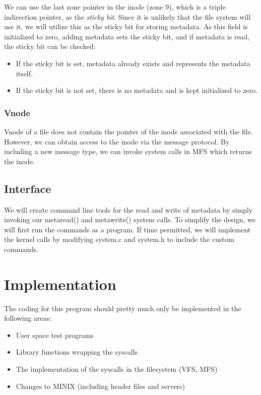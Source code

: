\documentclass[paper=a4, fontsize=11pt]{scrartcl}
\numberwithin{equation}{section} %
\numberwithin{figure}{section} %
\numberwithin{table}{section} %
\begin{document}
	We can use the last zone pointer in the inode (zone 9), which is a triple indirection pointer, as the {\it sticky bit}. Since it is unlikely that the file system will use it, we will utilize this as the sticky bit for storing metadata. As this field is initialized to zero, adding metadata sets the sticky bit, and if metadata is read, the sticky bit can be checked:

			\begin{itemize}
				\item If the sticky bit is set, metadata already exists and represents the metadata itself.
				\item If the sticky bit is not set, there is no metadata and is kept initialized to zero.
			\end{itemize}

		\subsubsection{Vnode}
		Vnode of a file does not contain the pointer of the inode associated with the file. However, we can obtain access to the inode via the message protocol. By including a new message type, we can invoke system calls in MFS which returns the inode.


	\subsection{Interface}
	We will create command line tools for the read and write of metadata by simply invoking our metaread() and metawrite() system calls. To simplify the design, we will first run the commands as a program. If time permitted, we will implement the kernel calls by modifying system.c and system.h to include the custom commands.




\section{Implementation}
The coding for this program should pretty much only be implemented in the following areas:
	\begin{itemize}
		\item User space test programs
		\item Library functions wrapping the syscalls
		\item The implementation of the syscalls in the filesystem (VFS, MFS)
		\item Changes to MINIX (including header files and servers)
	\end{itemize}
\end{document}
